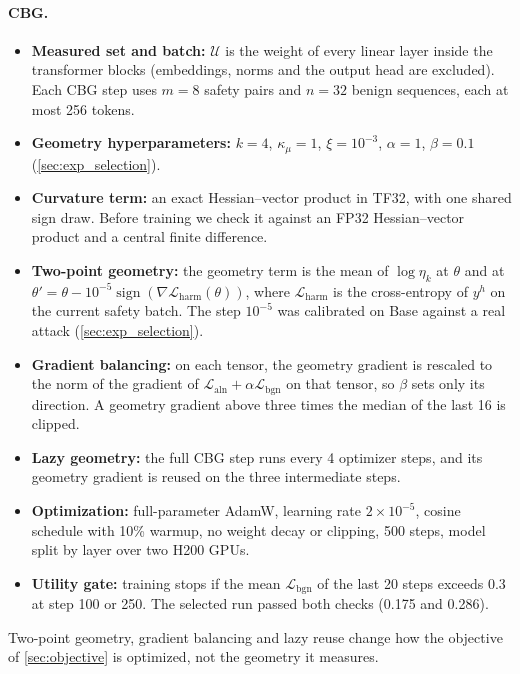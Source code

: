 \documentclass[11pt]{article}
\newcommand{\U}{\mathcal{U}}
\newcommand{\Laln}{\mathcal{L}_{\mathrm{aln}}}
\newcommand{\Lbgn}{\mathcal{L}_{\mathrm{bgn}}}
\newcommand{\etak}{\eta_{k}}
\begin{document}
\paragraph{CBG.}
\begin{itemize}
  \item \textbf{Measured set and batch:} $\U$ is the weight of every linear layer inside the transformer blocks (embeddings, norms and the output head are excluded). Each CBG step uses $m=8$ safety pairs and $n=32$ benign sequences, each at most 256 tokens.
  \item \textbf{Geometry hyperparameters:} $k=4$, $\kappa_\mu=1$, $\xi=10^{-3}$, $\alpha=1$, $\beta=0.1$ (\cref{sec:exp_selection}).
  \item \textbf{Curvature term:} an exact Hessian--vector product in TF32, with one shared sign draw. Before training we check it against an FP32 Hessian--vector product and a central finite difference.
  \item \textbf{Two-point geometry:} the geometry term is the mean of $\log\etak$ at $\theta$ and at $\theta'=\theta-10^{-5}\operatorname{sign}(\nabla\mathcal L_{\mathrm{harm}}(\theta))$, where $\mathcal L_{\mathrm{harm}}$ is the cross-entropy of $y^h$ on the current safety batch. The step $10^{-5}$ was calibrated on Base against a real attack (\cref{sec:exp_selection}).
  \item \textbf{Gradient balancing:} on each tensor, the geometry gradient is rescaled to the norm of the gradient of $\Laln+\alpha\Lbgn$ on that tensor, so $\beta$ sets only its direction. A geometry gradient above three times the median of the last 16 is clipped.
  \item \textbf{Lazy geometry:} the full CBG step runs every 4 optimizer steps, and its geometry gradient is reused on the three intermediate steps.
  \item \textbf{Optimization:} full-parameter AdamW, learning rate $2\times10^{-5}$, cosine schedule with 10\% warmup, no weight decay or clipping, 500 steps, model split by layer over two H200 GPUs.
  \item \textbf{Utility gate:} training stops if the mean $\Lbgn$ of the last 20 steps exceeds $0.3$ at step 100 or 250. The selected run passed both checks (0.175 and 0.286).
\end{itemize}
Two-point geometry, gradient balancing and lazy reuse change how the objective of \cref{sec:objective} is optimized, not the geometry it measures.
\end{document}
